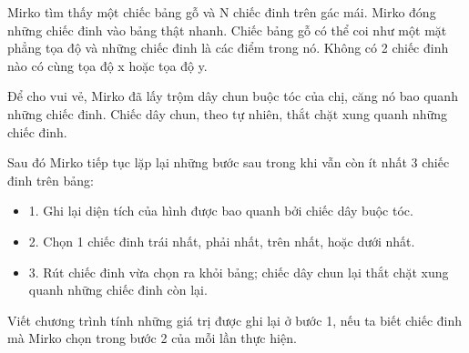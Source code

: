 Mirko tìm thấy một chiếc bảng gỗ và N chiếc đinh trên gác mái. Mirko đóng những chiếc đinh vào bảng thật nhanh. Chiếc bảng gỗ có thể coi như một mặt phẳng tọa độ và những chiếc đinh là các điểm trong nó. Không có 2 chiếc đinh nào có cùng tọa độ x hoặc tọa độ y.  

   Để cho vui vẻ, Mirko đã lấy trộm dây chun buộc tóc của chị, căng nó bao quanh những chiếc đinh. Chiếc dây chun, theo tự nhiên, thắt chặt xung quanh những chiếc đinh.  

   Sau đó Mirko tiếp tục lặp lại những bước sau trong khi vẫn còn ít nhất 3 chiếc đinh trên bảng:  
\begin{itemize}
	\item     1. Ghi lại diện tích của hình được bao quanh bởi chiếc dây buộc tóc.   
	\item     2. Chọn 1 chiếc đinh trái nhất, phải nhất, trên nhất, hoặc dưới nhất.   
	\item     3. Rút chiếc đinh vừa chọn ra khỏi bảng; chiếc dây chun lại thắt chặt xung quanh những chiếc đinh còn lại.   
\end{itemize}  Viết chương trình tính những giá trị được ghi lại ở bước 1, nếu ta biết chiếc đinh mà Mirko chọn trong bước 2 của mỗi lần thực hiện.  

\